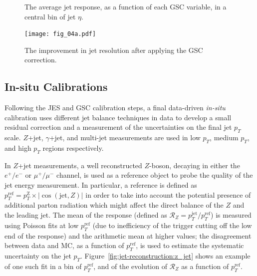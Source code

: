 \begin{figure}
\centering
{}

\label{fig:jet-reconstruction:gsc}
\caption{The average jet response, as a function of each GSC variable, in a central bin of jet $\eta$.}
\end{figure}

\begin{figure}
\centering
\texttt{[image: fig\_04a.pdf]}
\label{fig:jet-reconstruction:resolution_gsc}
\caption{The improvement in jet resolution after applying the GSC correction.}
\end{figure}


\subsection{In-situ Calibrations}

Following the JES and GSC calibration steps, a final data-driven \textit{in-situ} calibration uses different jet balance techniques in data to develop a small residual correction and a measurement of the uncertainties on the final jet $p_T$ scale. $Z$+jet, $\gamma$+jet, and multi-jet measurements are used in low $p_T$, medium $p_T$, and high $p_T$ regions respectively.

In $Z$+jet measurements, a well reconstructed $Z$-boson, decaying in either the $e^+/e^-$ or $\mu^+/\mu^-$ channel, is used as a reference object to probe the quality of the jet energy measurement. In particular, a reference \pt is defined as $p_T^\mathrm{ref} = p_T^\mathrm{Z} \times |\cos(\mathrm{jet}, Z) |$ in order to take into account the potential presence of additional parton radiation which might affect the direct balance of the $Z$ and the leading jet. The mean of the response (defined as $\mathcal{R}_Z = p_T^\mathrm{jet} / p_T^\mathrm{ref}$) is measured using Poisson fits at low $p_T^\mathrm{ref}$ (due to inefficiency of the trigger cutting off the low end of the response) and the arithmetic mean at higher values; the disagreement between data and MC, as a function of $p_T^\mathrm{ref}$, is used to estimate the systematic uncertainty on the jet $p_T$. Figure~\ref{fig:jet-reconstruction:z_jet} shows an example of one such fit in a bin of $p_T^\mathrm{ref}$, and of the evolution of $\mathcal{R}_Z$ as a function of $p_T^\mathrm{ref}$.

